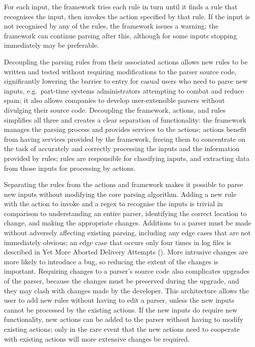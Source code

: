 For each input, the framework tries each rule in turn until it finds a rule
that recognises the input, then invokes the action specified by that rule.
If the input is not recognised by any of the rules, the framework issues a
warning; the framework can continue parsing after this, although for some
inputs stopping immediately may be preferable.

Decoupling the parsing rules from their associated actions allows new rules
to be written and tested without requiring modifications to the parser
source code, significantly lowering the barrier to entry for casual users
who need to parse new inputs, e.g.\ part-time systems administrators
attempting to combat and reduce spam; it also allows companies to develop
user-extensible parsers without divulging their source code.  Decoupling
the framework, actions, and rules simplifies all three and creates a clear
separation of functionality: the framework manages the parsing process and
provides services to the actions; actions benefit from having services
provided by the framework, freeing them to concentrate on the task of
accurately and correctly processing the inputs and the information provided
by rules; rules are responsible for classifying inputs, and extracting data
from those inputs for processing by actions.

Separating the rules from the actions and framework makes it possible to
parse new inputs without modifying the core parsing algorithm.  Adding a
new rule with the action to invoke and a regex to recognise the inputs is
trivial in comparison to understanding an entire parser, identifying the
correct location to change, and making the appropriate changes.  Additions
to a parser must be made without adversely affecting existing parsing,
including any edge cases that are not immediately obvious; an edge case
that occurs only four times in \numberOFlogFILES{} log files is described
in Yet More Aborted Delivery Attempts
().  More intrusive changes
are more likely to introduce a bug, so reducing the extent of the changes
is important.  Requiring changes to a parser's source code also complicates
upgrades of the parser, because the changes must be preserved during the
upgrade, and they may clash with changes made by the developer.  This
architecture allows the user to add new rules without having to edit a
parser, unless the new inputs cannot be processed by the existing actions.
If the new inputs do require new functionality, new actions can be added to
the parser without having to modify existing actions; only in the rare
event that the new actions need to cooperate with existing actions will
more extensive changes be required.

